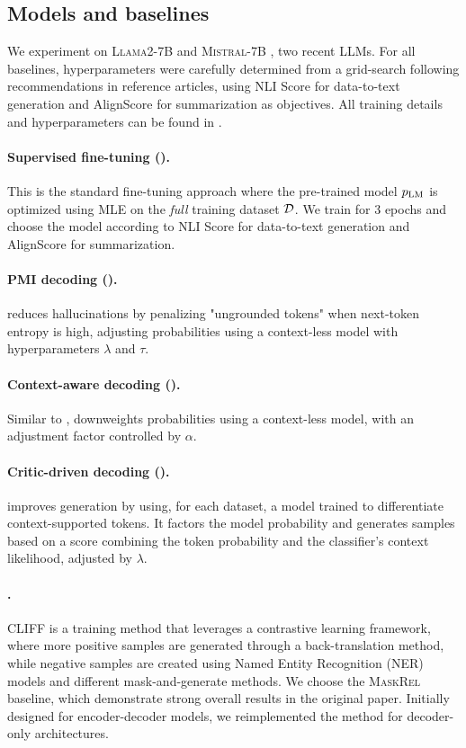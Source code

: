 \subsection{Models and baselines}
We experiment on \textsc{Llama2-7B} \citep{llama2} and \textsc{Mistral-7B} \citep{mistral}, two recent LLMs. 
For all baselines, hyperparameters were carefully determined from a grid-search following recommendations in reference articles, using NLI Score for data-to-text generation and AlignScore for summarization as objectives. All training details and hyperparameters can be found in .

\paragraph{Supervised fine-tuning (\sft).} This is the standard fine-tuning approach where the pre-trained model $p_{\text{LM}}$ is optimized using MLE on the \emph{full} training dataset $\mathcal{D}$. We train for 3 epochs and choose the model according to NLI Score for data-to-text generation and AlignScore for summarization.

\paragraph{PMI decoding (\pmi). } \citep{pmi} \pmi reduces hallucinations by penalizing "ungrounded tokens" when next-token entropy is high, adjusting probabilities using a context-less model with hyperparameters \( \lambda \) and \( \tau \).

\paragraph{Context-aware decoding (\cad).} \citep{cad}  Similar to \pmi, \cad downweights probabilities using a context-less model, with an adjustment factor controlled by \( \alpha \).

\paragraph{Critic-driven decoding (\critic).} \citep{critic-driven} \critic improves generation by using, for each dataset, a model trained to differentiate context-supported tokens. It factors the model probability and generates samples based on a score combining the token probability and the classifier's context likelihood, adjusted by \( \lambda \).


\paragraph{\cliff.} \citep{cao-wang-2021-cliff} CLIFF is a training method that leverages a contrastive learning framework, where more positive samples are generated through a back-translation method, while negative samples are created using Named Entity Recognition (NER) models and different mask-and-generate methods. We choose the \textsc{MaskRel} baseline, which demonstrate strong overall results in the original paper. Initially designed for encoder-decoder models, we reimplemented the method for decoder-only architectures.

